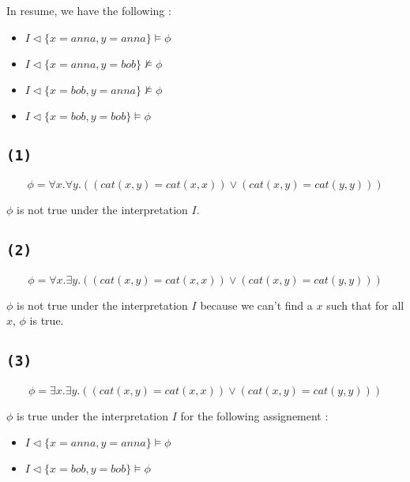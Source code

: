 \documentclass[a4paper,11pt]{report}
\begin{document}
In resume, we have the following :

\begin{itemize}
\item $I \lhd \{x = anna, y = anna \} \models \phi$
\item $I \lhd \{x = anna, y = bob \} \not\models \phi$
\item $I \lhd \{x = bob, y = anna \} \not\models \phi$
\item $I \lhd \{x = bob, y = bob \} \models \phi$
\end{itemize}

\subsection*{\texttt{(1)}}

\[
  \phi = \forall x. \forall y. ((cat(x,y) = cat(x,x)) \vee (cat(x,y) = cat(y,y)))
\]

$\phi$ is not true under the interpretation $I$.

\subsection*{\texttt{(2)}}

\[
  \phi = \forall x. \exists y. ((cat(x,y) = cat(x,x)) \vee (cat(x,y) = cat(y,y)))
\]

$\phi$ is not true under the interpretation $I$ because we can't find a $x$
such that for all $x$, $\phi$ is true.

\subsection*{\texttt{(3)}}

\[
  \phi = \exists x. \exists y. ((cat(x,y) = cat(x,x)) \vee (cat(x,y) = cat(y,y)))
\]

$\phi$ is true under the interpretation $I$ for the following assignement :

\begin{itemize}
\item $I \lhd \{x = anna, y = anna \} \models \phi$
\item $I \lhd \{x = bob, y = bob \} \models \phi$
\end{itemize}
\end{document}

